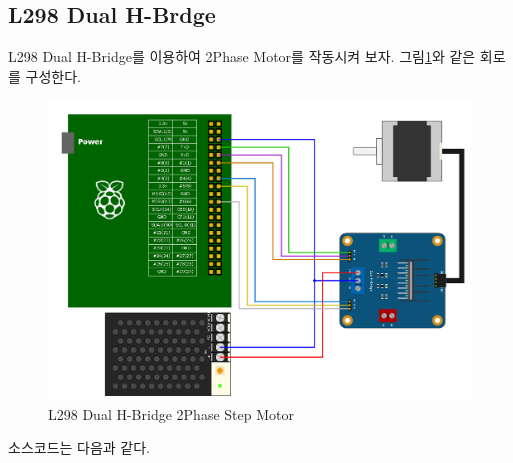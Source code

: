 \documentclass[11pt
  , a4paper
  , article
  , oneside
]{memoir}
\begin{document}
\subsection{L298 Dual H-Brdge}
L298 Dual H-Bridge를 이용하여 2Phase Motor를 작동시켜 보자.
그림\ref{fig:l298_test}와 같은 회로를 구성한다.
\begin{figure}[!htb]
\centering
\includegraphics[width=1\textwidth]{./images/raspberry/L298Test.png}
\caption{L298 Dual H-Bridge 2Phase Step Motor}
\label{fig:l298_test}
\end{figure}
소스코드는 다음과 같다.
\end{document}
